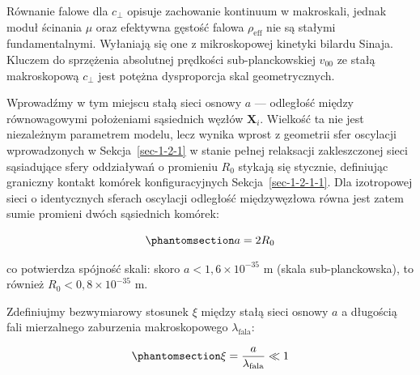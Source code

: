 \documentclass[
  polish,
  letterpaper,
  DIV=11,
  numbers=noendperiod,
  oneside]{scrartcl}
\begin{document}
Równanie falowe dla \(c_{\perp}\) opisuje zachowanie kontinuum w
makroskali, jednak moduł ścinania \(\mu\) oraz efektywna gęstość falowa
\(\rho_{\text{eff}}\) nie są stałymi fundamentalnymi. Wyłaniają się one
z mikroskopowej kinetyki bilardu Sinaja. Kluczem do sprzężenia
absolutnej prędkości sub-planckowskiej \(v_\text{00}\) ze stałą
makroskopową \(c_{\perp}\) jest potężna dysproporcja skal
geometrycznych.

Wprowadźmy w tym miejscu stałą sieci osnowy \(a\) --- odległość między
równowagowymi położeniami sąsiednich węzłów \(\mathbf{X}_i\). Wielkość
ta nie jest niezależnym parametrem modelu, lecz wynika wprost z
geometrii sfer oscylacji wprowadzonych w Sekcja~\ref{sec-1-2-1} w stanie
pełnej relaksacji zakleszczonej sieci sąsiadujące sfery oddziaływań o
promieniu \(R_0\) stykają się stycznie, definiując graniczny kontakt
komórek konfiguracyjnych Sekcja~\ref{sec-1-2-1-1}. Dla izotropowej sieci
o identycznych sferach oscylacji odległość międzywęzłowa równa jest
zatem sumie promieni dwóch sąsiednich komórek:

\begin{equation}\protect\phantomsection\label{eq-sek1-3-stala-sieci}{a = 2R_0}\end{equation}

co potwierdza spójność skali: skoro \(a < 1{,}6 \times 10^{-35}\) m
(skala sub-planckowska), to również \(R_0 < 0{,}8 \times 10^{-35}\) m.

Zdefiniujmy bezwymiarowy stosunek \(\xi\) między stałą sieci osnowy
\(a\) a długością fali mierzalnego zaburzenia makroskopowego
\(\lambda_\text{fala}\):

\begin{equation}\protect\phantomsection\label{eq-sek1-3-bezw-stos-sieci-al}{\xi = \frac{a}{\lambda_\text{fala}} \ll 1}\end{equation}
\end{document}
